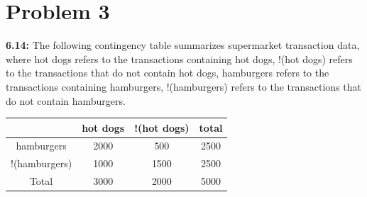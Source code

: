 \clearpage

\section*{Problem 3}
\textbf{6.14:} The following contingency table summarizes supermarket transaction data, 
where hot dogs refers to the transactions containing hot dogs, 
!(hot dogs) refers to the transactions that do not contain hot dogs, 
hamburgers refers to the transactions containing hamburgers, 
!(hamburgers) refers to the transactions that do not contain hamburgers.

\begin{center}
	\begin{tabular}{ |c|c|c|c| } 
		\hline
		 & hot dogs & !(hot dogs) & total \\
		\hline
			hamburgers & 2000 & 500 & 2500 \\
			!(hamburgers) & 1000 & 1500 & 2500 \\
			Total & 3000 & 2000 & 5000 \\
		\hline
	\end{tabular}
\end{center}

